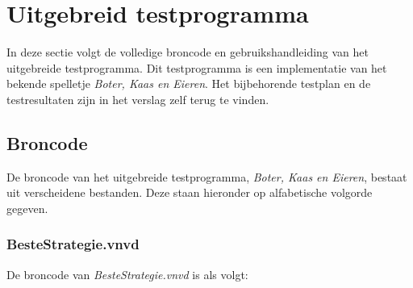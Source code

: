 \section{Uitgebreid testprogramma}
In deze sectie volgt de volledige broncode en gebruikshandleiding van het uitgebreide testprogramma. Dit testprogramma is een implementatie van het bekende spelletje \textit{Boter, Kaas en Eieren}. Het bijbehorende testplan en de testresultaten zijn in het verslag zelf terug te vinden.

\subsection{Broncode}
De broncode van het uitgebreide testprogramma, \textit{Boter, Kaas en Eieren}, bestaat uit verscheidene bestanden. Deze staan hieronder op alfabetische volgorde gegeven.

\subsubsection{BesteStrategie.vnvd}
De broncode van \textit{BesteStrategie.vnvd} is als volgt:

